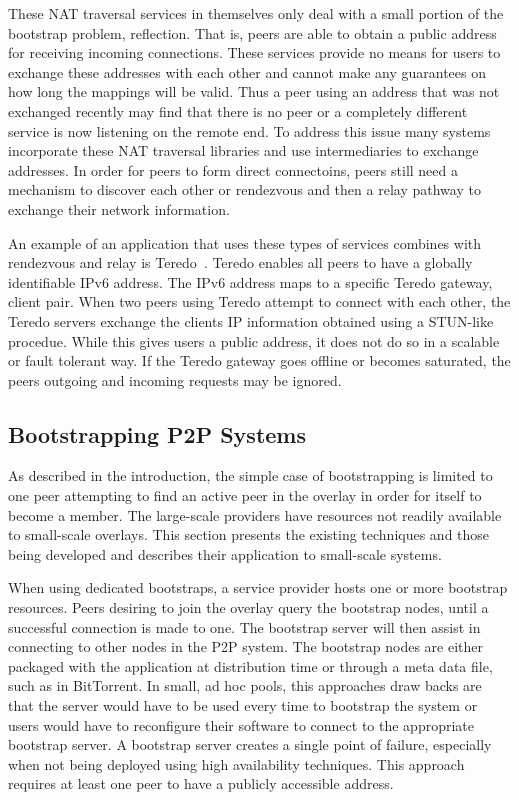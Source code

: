 \documentclass[conference]{IEEEtran}
\begin{document}
These NAT traversal services in themselves only deal with a small portion of
the bootstrap problem, reflection.  That is, peers are able to obtain a public
address for receiving incoming connections.  These services provide no means
for users to exchange these addresses with each other and cannot make any
guarantees on how long the mappings will be valid.  Thus a peer using an
address that was not exchanged recently may find that there is no peer or a
completely different service is now listening on the remote end.  To address
this issue many systems incorporate these NAT traversal libraries and use
intermediaries to exchange addresses.  In order for peers to form direct
connectoins, peers still need a mechanism to discover each other or rendezvous
and then a relay pathway to exchange their network information.

An example of an application that uses these types of services combines with
rendezvous and relay is Teredo~\cite{teredo}.  Teredo enables all peers to have
a globally identifiable IPv6 address.  The IPv6 address maps to a specific
Teredo gateway, client pair.  When two peers using Teredo attempt to connect
with each other, the Teredo servers exchange the clients IP information
obtained using a STUN-like procedue.  While this gives users a public address,
it does not do so in a scalable or fault tolerant way.  If the Teredo gateway
goes offline or becomes saturated, the peers outgoing and incoming requests may
be ignored.

\subsection{Bootstrapping P2P Systems}

As described in the introduction, the simple case of bootstrapping is limited
to one peer attempting to find an active peer in the overlay in order for
itself to become a member.  The large-scale providers have resources not
readily available to small-scale overlays.  This section presents the existing
techniques and those being developed and describes their application to
small-scale systems.

When using dedicated bootstraps, a service provider hosts one or more bootstrap
resources.  Peers desiring to join the overlay query the bootstrap nodes, until
a successful connection is made to one.  The bootstrap server will then assist
in connecting to other nodes in the P2P system.  The bootstrap nodes are either
packaged with the application at distribution time or through a meta data file,
such as in BitTorrent.  In small, ad hoc pools, this approaches draw backs are
that the server would have to be used every time to bootstrap the system or
users would have to reconfigure their software to connect to the appropriate
bootstrap server.  A bootstrap server creates a single point of failure,
especially when not being deployed using high availability techniques.  This
approach requires at least one peer to have a publicly accessible address.
\end{document}

